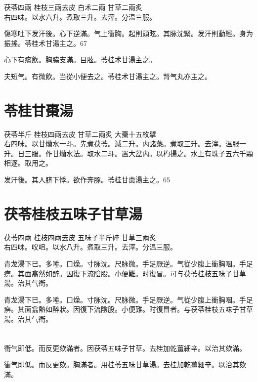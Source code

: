 茯苓{\scriptsize 四兩} 桂枝{\scriptsize 三兩去皮} 白术{\scriptsize 二兩} 甘草{\scriptsize 二兩炙}\\
右四味。以水六升。煮取三升。去滓。分温三服。

傷寒吐下发汗後。心下逆滿。气上衝胸。起則頭眩。其脉沈緊。发汗則動經。身为振搖。苓桂术甘湯主之。67

心下有痰飲。胸脇支滿。目胘。苓桂术甘湯主之。

夫短气。有微飲。当從小便去之。苓桂术甘湯主之。腎气丸亦主之。

\section{苓桂甘棗湯}

茯苓{\scriptsize 半斤} 桂枝{\scriptsize 四兩去皮} 甘草{\scriptsize 二兩炙} 大棗{\scriptsize 十五枚擘}\\
右四味。以甘爤水一斗。先煮茯苓。減二升。内諸藥。煮取三升。去滓。温服一升。日三服。作甘爤水法。取水二斗。置大盆内。以杓揚之。水上有珠子五六千顆相逐。取用之。

发汗後。其人脐下悸。欲作奔豚。苓桂甘棗湯主之。65

\section{茯苓桂枝五味子甘草湯}

茯苓{\scriptsize 四兩} 桂枝{\scriptsize 四兩去皮} 五味子{\scriptsize 半斤碎} 甘草{\scriptsize 三兩炙}\\
右四味。㕮咀。以水八升。煮取三升。去滓。分温三服。

青龙湯下已。多唾。口燥。寸脉沈。尺脉微。手足厥逆。气從少腹上衝胸咽。手足痹。其面翕然如醉。因復下流陰股。小便難。时復冒。可与茯苓桂枝五味子甘草湯。治其气衝。{\wuben}

青龙湯下已。多唾。口燥。寸脉沈。尺脉微。手足厥逆。气從少腹上衝胸咽。手足痹。其面翕熱如醉狀。因復下流陰股。小便難。时復冒者。与茯苓桂枝五味子甘草湯。治其气衝。{\dengben}

\section{}

衝气即低。而反更欬滿者。因茯苓五味子甘草。去桂加乾薑細辛。以治其欬滿。{\wuben}

衝气即低。而反更欬。胸滿者。用桂苓五味甘草湯。去桂加乾薑細辛。以治其欬滿。{\dengben}

\section{}

